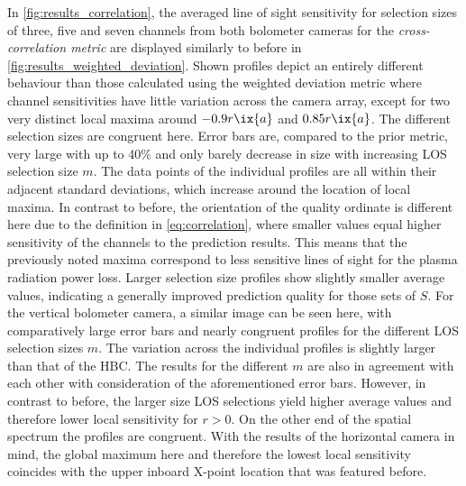                 In \cref{fig:results_correlation}, the averaged line of sight sensitivity for selection sizes of three, five and seven channels from both bolometer cameras for the \textit{cross-correlation metric} are displayed similarly to before in \cref{fig:results_weighted_deviation}. Shown profiles depict an entirely different behaviour than those calculated using the weighted deviation metric where channel sensitivities have little variation across the camera array, except for two very distinct local maxima around $-0.9r\ix{a}$ and $0.85r\ix{a}$. The different selection sizes are congruent here. Error bars are, compared to the prior metric, very large with up to 40\% and only barely decrease in size with increasing LOS selection size $m$. The data points of the individual profiles are all within their adjacent standard deviations, which increase around the location of local maxima. In contrast to before, the orientation of the quality ordinate is different here due to the definition in \cref{eq:correlation}, where smaller values equal higher sensitivity of the channels to the prediction results. This means that the previously noted maxima correspond to less sensitive lines of sight for the plasma radiation power loss. Larger selection size profiles show slightly smaller average values, indicating a generally improved prediction quality for those sets of $S$. For the vertical bolometer camera, a similar image can be seen here, with comparatively large error bars and nearly congruent profiles for the different LOS selection sizes $m$. The variation across the individual profiles is slightly larger than that of the HBC. The results for the different $m$ are also in agreement with each other with consideration of the aforementioned error bars. However, in contrast to before, the larger size LOS selections yield higher average values and therefore lower local sensitivity for $r>0$. On the other end of the spatial spectrum the profiles are congruent. With the results of the horizontal camera in mind, the global maximum here and therefore the lowest local sensitivity coincides with the upper inboard  X-point location that was featured before.\\%
%
